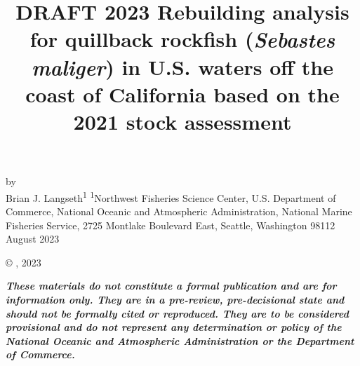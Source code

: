 \documentclass[11pt,
  letterpaper,
]{article}
\date{}
\newcommand{\trTitle}{DRAFT 2023 Rebuilding analysis for quillback rockfish (\emph{Sebastes maliger}) in U.S. waters off the coast of California based on the 2021 stock assessment}
\newcommand{\trYear}{2023}
\newcommand{\trMonth}{August}
\newcommand\includegraphicsifexists[2][width=\linewidth]{\IfFileExists{#2}{\texttt{[image: \#2]}}{}}
\begin{document}

\renewcommand*{\thefootnote}{\fnsymbol{footnote}}

\small
\thispagestyle{empty}
\noindent
\begin{center}
\title{DRAFT 2023 Rebuilding analysis for quillback rockfish (\emph{Sebastes maliger}) in U.S. waters off the coast of California based on the 2021 stock assessment}
\vspace{1.5cm}
{\Large\textbf{}}

\includegraphicsifexists[width=4in]{figure_title.png}
\vfill
by\\
Brian J. Langseth\textsuperscript{1}\vfill
\textsuperscript{1}Northwest Fisheries Science Center, U.S. Department of Commerce, National Oceanic and Atmospheric Administration, National Marine Fisheries Service, 2725 Montlake Boulevard East, Seattle, Washington 98112\vfill
\trMonth{} \trYear{}
\end{center}
\clearpage

\thispagestyle{empty}
\vspace*{\fill}
\begin{center}
\copyright{} , \trYear{}\\
\end{center}
\par
\bigskip
\noindent
\bigskip
\par
\textbf{\textit{These materials do not constitute a formal publication and are for
information only. They are in a pre-review, pre-decisional state and
should not be formally cited or reproduced. They are to be considered
provisional and do not represent any determination or policy of the
National Oceanic and Atmospheric Administration or the Department of
Commerce.}}

\clearpage


\tableofcontents\clearpage
\label{TRlastRoman}
\clearpage

\newpage
\thispagestyle{empty} %
\end{document}
